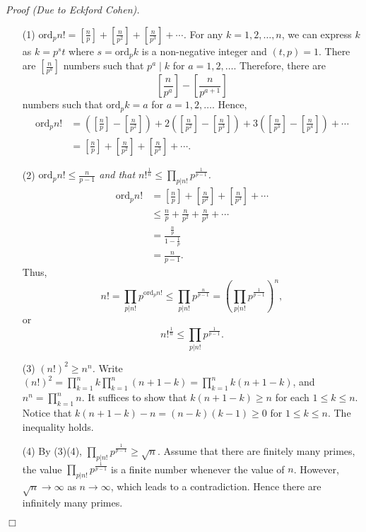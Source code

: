 \documentclass{article}
\begin{document}
\emph{Proof (Due to Eckford Cohen).}
\begin{enumerate}
\item[(1)]
  \emph{$\text{ord}_p n!
  = \left[\frac{n}{p}\right] + \left[\frac{n}{p^2}\right] + \left[\frac{n}{p^3}\right] + \cdots$.}
  For any $k = 1, 2, \ldots, n$, we can express $k$ as $k = p^s t$
  where $s = \text{ord}_p k$ is a non-negative integer and $(t, p) = 1$.
  There are $[\frac{n}{p^a}]$ numbers such that $p^a \mid k$ for $a = 1, 2, \ldots$.
  Therefore, there are $$\left[\frac{n}{p^a}\right] - \left[\frac{n}{p^{a+1}}\right]$$
  numbers such that $\text{ord}_p k = a$ for $a = 1, 2, \ldots$. Hence,
  \begin{align*}
  \text{ord}_p n!
    &= \left( \left[\frac{n}{p}\right] - \left[\frac{n}{p^2}\right] \right)
     + 2 \left( \left[\frac{n}{p^2}\right] - \left[\frac{n}{p^3}\right] \right)
     + 3 \left( \left[\frac{n}{p^3}\right] - \left[\frac{n}{p^4}\right] \right) + \cdots \\
    &= \left[\frac{n}{p}\right] + \left[\frac{n}{p^2}\right] + \left[\frac{n}{p^3}\right] + \cdots.
  \end{align*}

\item[(2)]
  \emph{$\text{ord}_p n! \leq \frac{n}{p - 1}$ and that
  $n!^{\frac{1}{n}} \leq \prod_{p|n!}p^{\frac{1}{p - 1}}$.}
  \begin{align*}
  \text{ord}_p n!
  &= \left[\frac{n}{p}\right] + \left[\frac{n}{p^2}\right] + \left[\frac{n}{p^3}\right] + \cdots \\
  &\leq \frac{n}{p} + \frac{n}{p^2} + \frac{n}{p^3} + \cdots \\
  &= \frac{\frac{n}{p}}{1 - \frac{1}{p}} \\
  &= \frac{n}{p - 1}.
  \end{align*}
  Thus,
  \[
    n!
    = \prod_{p|n!} p^{\text{ord}_p n!}
    \leq \prod_{p|n!} p^{\frac{n}{p - 1}}
    = \left( \prod_{p|n!} p^{\frac{1}{p - 1}} \right)^n,
  \]
  or
  \[
    n!^{\frac{1}{n}} \leq \prod_{p|n!}p^{\frac{1}{p - 1}}.
  \]

\item[(3)]
  \emph{$(n!)^2 \geq n^n$.}
  Write
  $(n!)^2 = \prod_{k=1}^n k \prod_{k=1}^n (n + 1 - k) = \prod_{k=1}^n k(n + 1 - k)$,
  and $n^n = \prod_{k=1}^n n$.
  It suffices to show that $k(n + 1 - k) \geq n$ for each $1 \leq k \leq n$.
  Notice that $k(n + 1 - k) - n = (n - k)(k - 1) \geq 0$ for $1 \leq k \leq n$.
  The inequality holds.

\item[(4)]
  By (3)(4), $\prod_{p|n!}p^{\frac{1}{p - 1}} \geq \sqrt{n}$.
  Assume that there are finitely many primes,
  the value $\prod_{p|n!} p^{\frac{1}{p - 1}}$ is a finite number
  whenever the value of $n$.
  However, $\sqrt{n} \rightarrow \infty$ as $n \rightarrow \infty$,
  which leads to a contradiction.
  Hence there are infinitely many primes.
\end{enumerate}
$\Box$ \\
\end{document}

